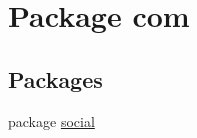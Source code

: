 \hypertarget{namespacecom}{}\section{Package com}
\label{namespacecom}
\subsection*{Packages}
\begin{DoxyCompactItemize}
\item 
package \hyperlink{namespacecom_1_1social}{social}
\end{DoxyCompactItemize}
